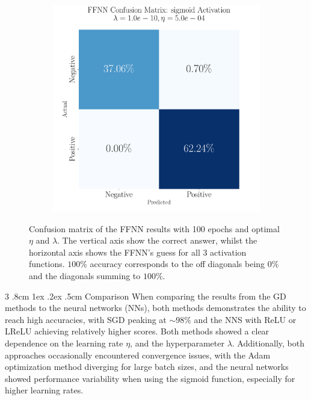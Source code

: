 \documentclass[%
reprint,s
amsmath,amssymb,
aps,
]{revtex4-2}
\makeatletter
\renewcommand{\subsubsection}{%
	\@startsection
	{subsubsection}%
	{3}%
	{\z@}%
	{.8cm \@plus1ex \@minus .2ex}%
	{.5cm}%
	{\normalfont\small\centering}%
}
\makeatother
\begin{document}
\begin{figure}[b]
\begin{subfigure}{0.325\textwidth}
	\end{subfigure}
	\hfill
	\begin{subfigure}{0.325\textwidth}
		\includegraphics[width=\textwidth]{Figures/ConfusionMatrixFFNN_sigmoid_Epochs100_randomstate42.pdf}
	\end{subfigure}
	\caption{Confusion matrix of the FFNN results with 100 epochs and optimal $\eta$ and $\lambda$. The vertical axis show the correct answer, whilst the horizontal axis shows the FFNN's guess for all 3 activation functions. $100\%$ accuracy corresponds to the off diagonals being $0\%$ and the diagonals summing to $100\%$.}
	\label{fig:Confusion_FFNN}
\end{figure}

\subsubsection{Comparison}
When comparing the results from the GD methods to the neural networks (NNs), both methods demonstrates the ability to reach high accuracies, with SGD peaking at \(\sim 98\%\) and the NNS with ReLU or LReLU achieving relatively higher scores. Both methods showed a clear dependence on the learning rate \(\eta\), and the hyperparameter \(\lambda\). Additionally, both approaches occasionally encountered convergence issues, with the Adam optimization method diverging for large batch sizes, and the neural networks showed performance variability when using the sigmoid function, especially for higher learning rates. 
\end{document}
